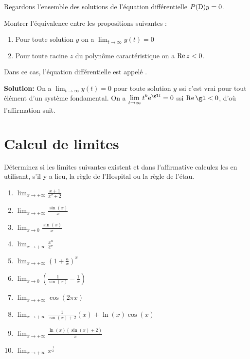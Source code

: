 \bigskip
\exerNico
Regardons l'ensemble des solutions de l'équation différentielle $P({\rm D})y =0$.

Montrer l'équivalence entre les propositions suivantes :
\begin{enumerate}

\item
Pour toute solution $y$ on a $\displaystyle \lim_{t \to \infty} y(t) = 0$

\item
Pour toute racine $z$ du polynôme caractéristique on a ${\rm Re}\, z <0$.

\end{enumerate}
Dans ce cas, l'équation différentielle est appelé  .

\bigskip
{\bf Solution:}
On a
$\displaystyle \lim_{t \to \infty} y(t) = 0$ pour toute solution $y$ ssi c'est vrai pour tout élément d'un système fondamental.
On a $\displaystyle \lim_{t \to \infty} t^k {\rm e}^{\gl t}=0$ ssi ${\rm Re }\,\gl <0$,
d'où l'affirmation suit.






\section{Calcul de limites}

\exerNico Déterminez si les limites suivantes existent et dans
l'affirmative calculez les en utilisant, s'il y a lieu, la règle de
l'Hospital ou la règle de l'étau.
\begin{enumerate}
\item $  \lim_{x \rightarrow  +\infty} \frac{x+1}{x^2+2} $
\item $  \lim_{x \rightarrow  +\infty} \frac{\sin(x)}{x} $
\item $  \lim_{x \rightarrow  0} \frac{\sin(x)}{x} $
\item $  \lim_{x \rightarrow  +\infty}  \frac{x ^n}{e ^x} $
\item $  \lim_{x \rightarrow  +\infty} (1 + \frac{a}{x})^x $
\item $  \lim_{x \rightarrow  0} (\frac{1}{\sin(x)} - \frac{1}{x} )$
\item $  \lim_{x \rightarrow  +\infty} \cos( 2 \pi x) $
\item $  \lim_{x \rightarrow  +\infty} \frac{1}{\sin(x)+2}(x) +\ln(x)\cos(x) $
\item $  \lim_{x \rightarrow  +\infty} \frac{ \ln(x)(\sin(x) +2)}{x} $
\item $  \lim_{x \rightarrow  +\infty} x ^\frac{1}{x} $
\end{enumerate}

